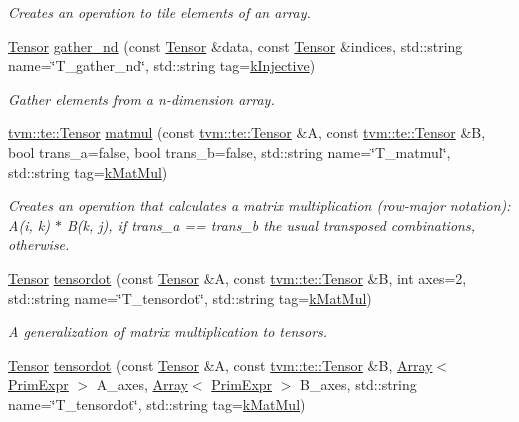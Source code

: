 \begin{DoxyCompactItemize}
\begin{DoxyCompactList}\small\item\em Creates an operation to tile elements of an array. \end{DoxyCompactList}\item 
\hyperlink{classtvm_1_1te_1_1Tensor}{Tensor} \hyperlink{namespacetopi_a2c6dddfadb41fdddcbefa37aaf28b5e1}{gather\+\_\+nd} (const \hyperlink{classtvm_1_1te_1_1Tensor}{Tensor} \&data, const \hyperlink{classtvm_1_1te_1_1Tensor}{Tensor} \&indices, std\+::string name=\char`\"{}T\+\_\+gather\+\_\+nd\char`\"{}, std\+::string tag=\hyperlink{namespacetopi_a60f05ec416e4618d25ad00dd9f536934}{k\+Injective})
\begin{DoxyCompactList}\small\item\em Gather elements from a n-\/dimension array. \end{DoxyCompactList}\item 
\hyperlink{classtvm_1_1te_1_1Tensor}{tvm\+::te\+::\+Tensor} \hyperlink{namespacetopi_ac7762b21d678dc6398f9fb9df243c04d}{matmul} (const \hyperlink{classtvm_1_1te_1_1Tensor}{tvm\+::te\+::\+Tensor} \&A, const \hyperlink{classtvm_1_1te_1_1Tensor}{tvm\+::te\+::\+Tensor} \&B, bool trans\+\_\+a=false, bool trans\+\_\+b=false, std\+::string name=\char`\"{}T\+\_\+matmul\char`\"{}, std\+::string tag=\hyperlink{namespacetopi_a06a6892f5e4681142f0c08b0af32499d}{k\+Mat\+Mul})
\begin{DoxyCompactList}\small\item\em Creates an operation that calculates a matrix multiplication (row-\/major notation)\+: A(i, k) $\ast$ B(k, j), if trans\+\_\+a == trans\+\_\+b the usual transposed combinations, otherwise. \end{DoxyCompactList}\item 
\hyperlink{classtvm_1_1te_1_1Tensor}{Tensor} \hyperlink{namespacetopi_a989014206b809ee5279f5ec37008a457}{tensordot} (const \hyperlink{classtvm_1_1te_1_1Tensor}{Tensor} \&A, const \hyperlink{classtvm_1_1te_1_1Tensor}{tvm\+::te\+::\+Tensor} \&B, int axes=2, std\+::string name=\char`\"{}T\+\_\+tensordot\char`\"{}, std\+::string tag=\hyperlink{namespacetopi_a06a6892f5e4681142f0c08b0af32499d}{k\+Mat\+Mul})
\begin{DoxyCompactList}\small\item\em A generalization of matrix multiplication to tensors. \end{DoxyCompactList}\item 
\hyperlink{classtvm_1_1te_1_1Tensor}{Tensor} \hyperlink{namespacetopi_a261c3dc04ec102c8174b1169bcefbbe1}{tensordot} (const \hyperlink{classtvm_1_1te_1_1Tensor}{Tensor} \&A, const \hyperlink{classtvm_1_1te_1_1Tensor}{tvm\+::te\+::\+Tensor} \&B, \hyperlink{classtvm_1_1Array}{Array}$<$ \hyperlink{classtvm_1_1PrimExpr}{Prim\+Expr} $>$ A\+\_\+axes, \hyperlink{classtvm_1_1Array}{Array}$<$ \hyperlink{classtvm_1_1PrimExpr}{Prim\+Expr} $>$ B\+\_\+axes, std\+::string name=\char`\"{}T\+\_\+tensordot\char`\"{}, std\+::string tag=\hyperlink{namespacetopi_a06a6892f5e4681142f0c08b0af32499d}{k\+Mat\+Mul})

\end{DoxyCompactItemize}
